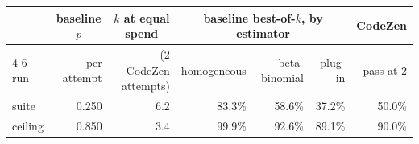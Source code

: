 
\begin{tabular}{@{}lrrrrrr@{}}
\toprule
 & \multicolumn{1}{c}{baseline $\bar p$} & \multicolumn{1}{c}{$k$ at equal spend} &
 \multicolumn{3}{c}{baseline best-of-$k$, by estimator} & \multicolumn{1}{c}{CodeZen} \\
\cmidrule(lr){4-6}
run & per attempt & (2 CodeZen attempts) & homogeneous & beta-binomial & plug-in & pass-at-2 \\
\midrule
suite & 0.250 & 6.2 & 83.3\% & 58.6\% & 37.2\% & 50.0\% \\
ceiling & 0.850 & 3.4 & 99.9\% & 92.6\% & 89.1\% & 90.0\% \\
\bottomrule
\end{tabular}
